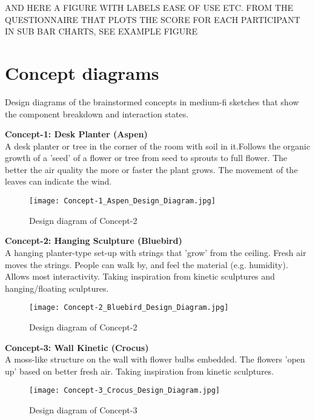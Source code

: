 \begin{appendices}
AND HERE A FIGURE WITH LABELS EASE OF USE ETC. FROM THE QUESTIONNAIRE THAT PLOTS THE SCORE FOR EACH PARTICIPANT IN SUB BAR CHARTS, SEE EXAMPLE FIGURE

\newpage

\section{Concept diagrams}
\label{appendix:conceptdiagrams}

Design diagrams of the brainstormed concepts in medium-fi sketches that show the component breakdown and interaction states.

\textbf{Concept-1: Desk Planter (Aspen)}\\
A desk planter or tree in the corner of the room with soil in it.Follows the organic growth of a 'seed' of a flower or tree from seed to sprouts to full flower. The better the air quality the more or faster the plant grows. The movement of the leaves can indicate the wind.


\begin{figure}[H]
    \centering
    \texttt{[image: Concept-1\_Aspen\_Design\_Diagram.jpg]}
    \caption{Design diagram of Concept-2}
    \label{fig:timeline}
\end{figure}

\textbf{Concept-2: Hanging Sculpture (Bluebird)}\\
A hanging planter-type set-up with strings that 'grow' from the ceiling. Fresh air moves the strings. People can walk by, and feel the material (e.g. humidity). Allows most interactivity. Taking inspiration from kinetic sculptures and hanging/floating sculptures.

\begin{figure}[H]
    \centering
    \texttt{[image: Concept-2\_Bluebird\_Design\_Diagram.jpg]}
    \caption{Design diagram of Concept-2}
    \label{fig:timeline}
\end{figure}

\newpage

\textbf{Concept-3: Wall Kinetic (Crocus)} \\
A moss-like structure on the wall with flower bulbs embedded. The flowers 'open up' based on better fresh air. Taking inspiration from kinetic sculptures.

\begin{figure}[H]
    \centering
    \texttt{[image: Concept-3\_Crocus\_Design\_Diagram.jpg]}
    \caption{Design diagram of Concept-3}
    \label{fig:timeline}
\end{figure}


\end{appendices}

